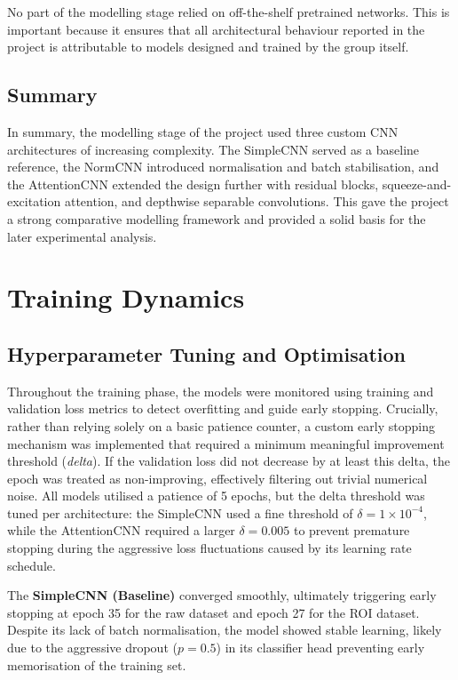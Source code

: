 \documentclass{article}
\begin{document}
No part of the modelling stage relied on off-the-shelf pretrained networks. This is important because it ensures that all architectural behaviour reported in the project is attributable to models designed and trained by the group itself.

\subsection{Summary}

In summary, the modelling stage of the project used three custom CNN architectures of increasing complexity. The SimpleCNN served as a baseline reference, the NormCNN introduced normalisation and batch stabilisation, and the AttentionCNN extended the design further with residual blocks, squeeze-and-excitation attention, and depthwise separable convolutions. This gave the project a strong comparative modelling framework and provided a solid basis for the later experimental analysis.

\section{Training Dynamics}

\subsection{Hyperparameter Tuning and Optimisation}

Throughout the training phase, the models were monitored using training and validation loss metrics to detect overfitting and guide early stopping. Crucially, rather than relying solely on a basic patience counter, a custom early stopping mechanism was implemented that required a minimum meaningful improvement threshold (\textit{delta}). If the validation loss did not decrease by at least this delta, the epoch was treated as non-improving, effectively filtering out trivial numerical noise. All models utilised a patience of 5 epochs, but the delta threshold was tuned per architecture: the SimpleCNN used a fine threshold of $\delta = 1\times 10^{-4}$, while the AttentionCNN required a larger $\delta = 0.005$ to prevent premature stopping during the aggressive loss fluctuations caused by its learning rate schedule.

The \textbf{SimpleCNN (Baseline)} converged smoothly, ultimately triggering early stopping at epoch 35 for the raw dataset and epoch 27 for the ROI dataset. Despite its lack of batch normalisation, the model showed stable learning, likely due to the aggressive dropout ($p=0.5$) in its classifier head preventing early memorisation of the training set.
\end{document}
